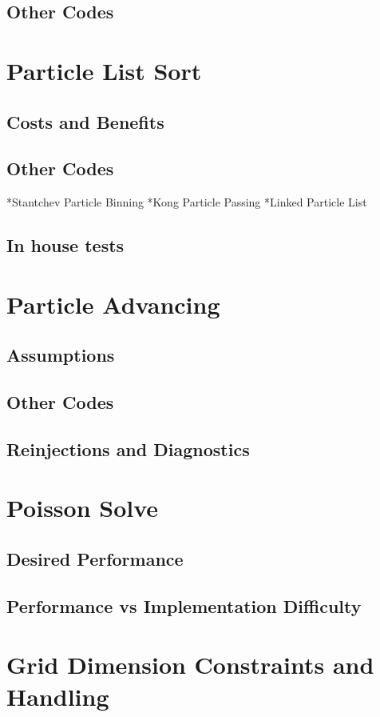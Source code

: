		\subsection{Other Codes}

	\section{Particle List Sort}
		\subsection{Costs and Benefits}
		\subsection{Other Codes}
		*Stantchev Particle Binning
		*Kong Particle Passing
		*Linked Particle List
		\subsection{In house tests}

	\section{Particle Advancing}
		\subsection{Assumptions}
		\subsection{Other Codes}
		\subsection{Reinjections and Diagnostics}

	\section{Poisson Solve}
		\subsection{Desired Performance}
		\subsection{Performance vs Implementation Difficulty}

	\section{Grid Dimension Constraints and Handling}
